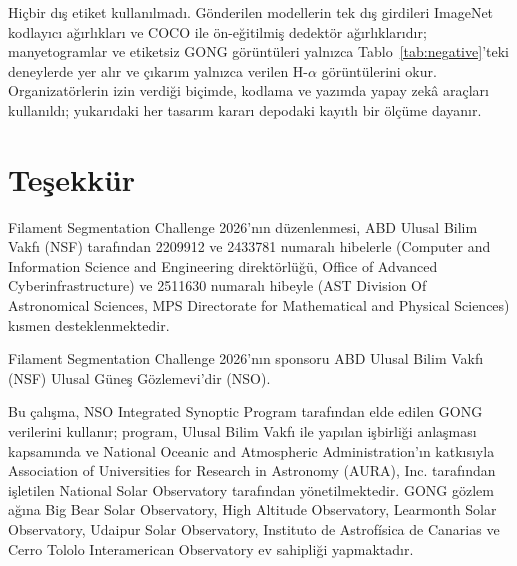 \documentclass[sigconf]{acmart}
\begin{document}
Hiçbir dış etiket kullanılmadı. Gönderilen modellerin tek dış girdileri ImageNet kodlayıcı ağırlıkları ve COCO ile ön-eğitilmiş dedektör ağırlıklarıdır; manyetogramlar ve etiketsiz GONG görüntüleri yalnızca Tablo~\ref{tab:negative}'teki deneylerde yer alır ve çıkarım yalnızca verilen H-$\alpha$ görüntülerini okur. Organizatörlerin izin verdiği biçimde, kodlama ve yazımda yapay zekâ araçları kullanıldı; yukarıdaki her tasarım kararı depodaki kayıtlı bir ölçüme dayanır.

\section{Teşekkür}\label{sec:acknowledgment}
    Filament Segmentation Challenge 2026'nın düzenlenmesi, ABD Ulusal Bilim Vakfı (NSF) tarafından 2209912 ve 2433781 numaralı hibelerle (Computer and Information Science and Engineering direktörlüğü, Office of Advanced Cyberinfrastructure) ve 2511630 numaralı hibeyle (AST Division Of Astronomical Sciences, MPS Directorate for Mathematical and Physical Sciences) kısmen desteklenmektedir.

    Filament Segmentation Challenge 2026'nın sponsoru ABD Ulusal Bilim Vakfı (NSF) Ulusal Güneş Gözlemevi'dir (NSO).

    Bu çalışma, NSO Integrated Synoptic Program tarafından elde edilen GONG verilerini kullanır; program, Ulusal Bilim Vakfı ile yapılan işbirliği anlaşması kapsamında ve National Oceanic and Atmospheric Administration'ın katkısıyla Association of Universities for Research in Astronomy (AURA), Inc. tarafından işletilen National Solar Observatory tarafından yönetilmektedir. GONG gözlem ağına Big Bear Solar Observatory, High Altitude Observatory, Learmonth Solar Observatory, Udaipur Solar Observatory, Instituto de Astrofísica de Canarias ve Cerro Tololo Interamerican Observatory ev sahipliği yapmaktadır.



\end{document}
